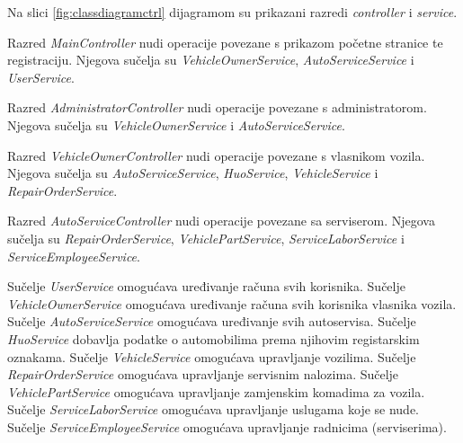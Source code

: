 		Na slici \ref{fig:classdiagramctrl} dijagramom su prikazani razredi \textit{controller} i \textit{service}.
		
		Razred \textit{MainController} nudi operacije povezane s prikazom početne stranice te registraciju. Njegova sučelja su \textit{VehicleOwnerService}, \textit{AutoServiceService} i \textit{UserService}.
		
		Razred \textit{AdministratorController} nudi operacije povezane s administratorom. Njegova sučelja su \textit{VehicleOwnerService} i \textit{AutoServiceService}. 
		
		Razred \textit{VehicleOwnerController} nudi operacije povezane s vlasnikom vozila. Njegova sučelja su \textit{AutoServiceService}, \textit{HuoService}, \textit{VehicleService} i \textit{RepairOrderService}.
		
		Razred \textit{AutoServiceController} nudi operacije povezane sa serviserom. Njegova sučelja su \textit{RepairOrderService}, \textit{VehiclePartService}, \textit{ServiceLaborService} i \textit{ServiceEmployeeService}.
		
		Sučelje \textit{UserService} omogućava uređivanje računa svih korisnika. Sučelje \textit{VehicleOwnerService} omogućava uređivanje računa svih korisnika vlasnika vozila. Sučelje \textit{AutoServiceService} omogućava uređivanje svih autoservisa. Sučelje \textit{HuoService} dobavlja podatke o automobilima prema njihovim registarskim oznakama. Sučelje \textit{VehicleService} omogućava upravljanje vozilima. Sučelje \textit{RepairOrderService} omogućava upravljanje servisnim nalozima. Sučelje \textit{VehiclePartService} omogućava upravljanje zamjenskim komadima za vozila. Sučelje \textit{ServiceLaborService} omogućava upravljanje uslugama koje se nude. Sučelje \textit{ServiceEmployeeService} omogućava upravljanje radnicima (serviserima).
		

